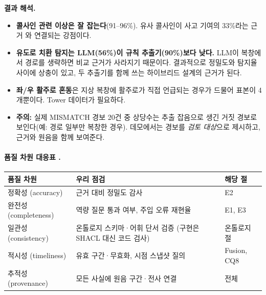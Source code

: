 \documentclass[10pt,a4paper]{article}
\begin{document}
\begin{addbox}
\textbf{결과 해석.}
\begin{itemize}[leftmargin=12pt]
\item \textbf{콜사인 관련 이상은 잘 잡는다}(91--96\%). 유사 콜사인이 사고 기여의 33\%라는 근거 \cite{eurocontrol}와 연결되는 강점이다.
\item \textbf{유도로 치환 탐지는 LLM(56\%)이 규칙 추출기(90\%)보다 낮다.} LLM이 복창에서 경로를 생략하면 비교 근거가 사라지기 때문이다. 결과적으로 정밀도와 탐지율 사이에 상충이 있고, 두 추출기를 함께 쓰는 하이브리드 설계의 근거가 된다.
\item \textbf{좌/우 활주로 혼동}은 지상 복창에 활주로가 직접 언급되는 경우가 드물어 표본이 4개뿐이다. Tower 데이터가 필요하다.
\item \textbf{주의:} 실제 MISMATCH 경보 20건 중 상당수는 추출 잡음으로 생긴 거짓 경보로 보인다(예: 경로 일부만 복창한 경우). 데모에서는 경보를 \emph{검토 대상}으로 제시하고, 근거와 원음을 함께 보여준다.
\end{itemize}
\end{addbox}

\paragraph{품질 차원 대응표 \cite{zaveri2016}.}
\begin{center}\small
\begin{tabular}{@{}lll@{}}
\toprule
품질 차원 & 우리 점검 & 해당 절\\\midrule
정확성 (accuracy) & 근거 대비 정밀도 감사 & E2\\
완전성 (completeness) & 역량 질문 통과 여부, 주입 오류 재현율 & E1, E3\\
일관성 (consistency) & 온톨로지 스키마·어휘 단서 검증 (구현은 SHACL 대신 코드 검사) & 온톨로지 절\\
적시성 (timeliness) & 유효 구간·무효화, 시점 스냅샷 질의 & Fusion, CQ8\\
추적성 (provenance) & 모든 사실에 원음 구간·전사 연결 & 전체\\
\bottomrule
\end{tabular}
\end{center}

\end{document}

